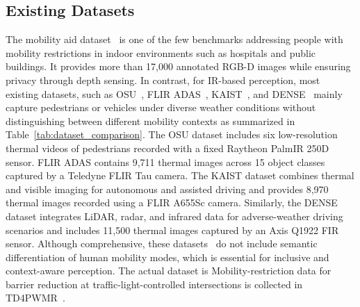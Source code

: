 \documentclass[journal,twoside,web]{ieeecolor}
\begin{document}
\subsection{Existing Datasets}
The mobility aid dataset~\cite{vasquez2017deep,kollmitz2019deep} is one of the few benchmarks addressing people with mobility restrictions in indoor environments such as hospitals and public buildings. It provides more than 17{,}000 annotated RGB-D images while ensuring privacy through depth sensing. In contrast, for IR-based perception, most existing datasets, such as OSU~\cite{davis2007background}, FLIR ADAS~\cite{flir_adas_dataset}, KAIST~\cite{choi2018kaist}, and DENSE~\cite{bijelic2020seeing} mainly capture pedestrians or vehicles under diverse weather conditions without distinguishing between different mobility contexts as summarized in Table~\ref{tab:dataset_comparison}. The OSU dataset includes six low-resolution thermal videos of pedestrians recorded with a fixed Raytheon PalmIR 250D sensor. FLIR ADAS contains 9{,}711 thermal images across 15 object classes captured by a Teledyne FLIR Tau camera. The KAIST dataset combines thermal and visible imaging for autonomous and assisted driving and provides 8{,}970 thermal images recorded using a FLIR A655Sc camera. Similarly, the DENSE dataset integrates LiDAR, radar, and infrared data for adverse-weather driving scenarios and includes 11{,}500 thermal images captured by an Axis Q1922 FIR sensor. Although comprehensive, these datasets~\cite{davis2007background,flir_adas_dataset,choi2018kaist,bijelic2020seeing} do not include semantic differentiation of human mobility modes, which is essential for inclusive and context-aware perception. The actual dataset is Mobility-restriction data for barrier reduction at traffic-light-controlled intersections is collected in TD4PWMR~\cite{ni2025thermal}.
\end{document}
